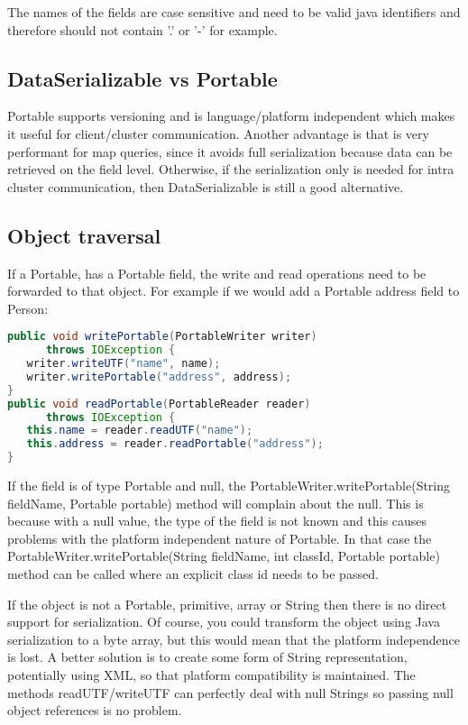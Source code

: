 The names of the fields are case sensitive and need to be valid java identifiers and therefore should not contain '.' or '-' for example. 

\subsection{DataSerializable vs Portable}
Portable supports versioning and is language/platform independent which makes it useful for client/cluster communication. Another advantage is that is very performant for map queries, since it avoids full serialization because data can be retrieved on the field level. Otherwise, if the serialization only is needed for intra cluster communication, then DataSerializable is still a good alternative.

\subsection*{Object traversal}
If a Portable, has a Portable field, the write and read operations need to be forwarded to that object. For example if we would add a Portable address field to Person:
\begin{lstlisting}[language=java]
public void writePortable(PortableWriter writer) 
      throws IOException {
   writer.writeUTF("name", name);
   writer.writePortable("address", address);
}
public void readPortable(PortableReader reader) 
      throws IOException {
   this.name = reader.readUTF("name");
   this.address = reader.readPortable("address");
}
\end{lstlisting}
If the field is of type Portable and null, the  PortableWriter.writePortable(String fieldName, Portable portable) method will complain about the null. This is because with a null value, the type of the field is not known and this causes problems with the platform independent nature of Portable. In that case the PortableWriter.writePortable(String fieldName, int classId, Portable portable) method can be called where an explicit class id needs to be passed. 

If the object is not a Portable, primitive, array or String then there is no direct support for serialization. Of course, you could transform the object using Java serialization to a byte array, but this would mean that the platform independence is lost. A better solution is to create some form of String representation, potentially using XML, so that platform compatibility is maintained. The methods readUTF/writeUTF can perfectly deal with null Strings so passing null object references is no problem.

